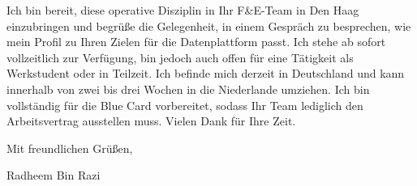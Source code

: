 \documentclass[11pt,a4paper]{coverletter}
\begin{document}
Ich bin bereit, diese operative Disziplin in Ihr F\&E-Team in Den Haag einzubringen und begrüße die Gelegenheit, in einem Gespräch zu besprechen, wie mein Profil zu Ihren Zielen für die Datenplattform passt. Ich stehe ab sofort vollzeitlich zur Verfügung, bin jedoch auch offen für eine Tätigkeit als Werkstudent oder in Teilzeit. Ich befinde mich derzeit in Deutschland und kann innerhalb von zwei bis drei Wochen in die Niederlande umziehen. Ich bin vollständig für die Blue Card vorbereitet, sodass Ihr Team lediglich den Arbeitsvertrag ausstellen muss. Vielen Dank für Ihre Zeit.

\closing{Mit freundlichen Grüßen,}{Radheem Bin Razi}
\end{document}
